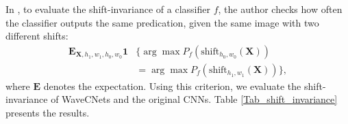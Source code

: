 In \cite{zhang2019making}, to evaluate the shift-invariance of a classifier $f$,
the author checks how often the classifier outputs the same predication, given the same image with two different shifts:
\begin{align}
\nonumber
\textbf{E}_{\textbf{X},h_1,w_1,h_0,w_0}\textbf{1}&\{\arg\max P_f(\text{shift}_{h_0,w_0}(\textbf{X})) \\
													&= \arg\max P_f(\text{shift}_{h_1,w_1}(\textbf{X}))\},
\end{align}
where $\textbf{E}$ denotes the expectation.
Using this criterion, we evaluate the shift-invariance of WaveCNets and the original CNNs.
Table \ref{Tab_shift_invariance} presents the results.
\begin{table}
\small
\caption{Shift-invariance of WaveCNets (higher is better).}
\label{Tab_shift_invariance}
\begin{center}
\end{center}
\end{table}

